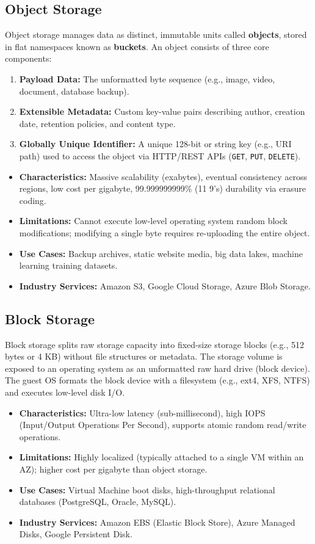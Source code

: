 \subsection{Object Storage}
Object storage manages data as distinct, immutable units called \textbf{objects}, stored in flat namespaces known as \textbf{buckets}. An object consists of three core components:
\begin{enumerate}
    \item \textbf{Payload Data:} The unformatted byte sequence (e.g., image, video, document, database backup).
    \item \textbf{Extensible Metadata:} Custom key-value pairs describing author, creation date, retention policies, and content type.
    \item \textbf{Globally Unique Identifier:} A unique 128-bit or string key (e.g., URI path) used to access the object via HTTP/REST APIs (\texttt{GET}, \texttt{PUT}, \texttt{DELETE}).
\end{enumerate}
\begin{itemize}
    \item \textbf{Characteristics:} Massive scalability (exabytes), eventual consistency across regions, low cost per gigabyte, 99.999999999\% (11 9's) durability via erasure coding.
    \item \textbf{Limitations:} Cannot execute low-level operating system random block modifications; modifying a single byte requires re-uploading the entire object.
    \item \textbf{Use Cases:} Backup archives, static website media, big data lakes, machine learning training datasets.
    \item \textbf{Industry Services:} Amazon S3, Google Cloud Storage, Azure Blob Storage.
\end{itemize}

\subsection{Block Storage}
Block storage splits raw storage capacity into fixed-size storage blocks (e.g., 512 bytes or 4 KB) without file structures or metadata. The storage volume is exposed to an operating system as an unformatted raw hard drive (block device). The guest OS formats the block device with a filesystem (e.g., ext4, XFS, NTFS) and executes low-level disk I/O.
\begin{itemize}
    \item \textbf{Characteristics:} Ultra-low latency (sub-millisecond), high IOPS (Input/Output Operations Per Second), supports atomic random read/write operations.
    \item \textbf{Limitations:} Highly localized (typically attached to a single VM within an AZ); higher cost per gigabyte than object storage.
    \item \textbf{Use Cases:} Virtual Machine boot disks, high-throughput relational databases (PostgreSQL, Oracle, MySQL).
    \item \textbf{Industry Services:} Amazon EBS (Elastic Block Store), Azure Managed Disks, Google Persistent Disk.
\end{itemize}

